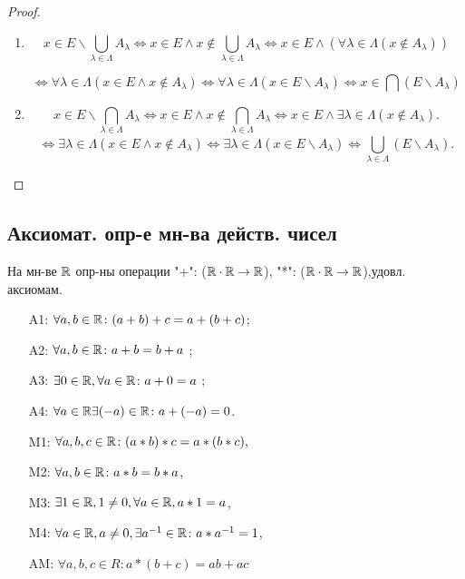 \begin{proof}
~\newline

\begin{enumerate}
    \item 
        \[
            x \in E \backslash \bigcup_{\lambda \in \Lambda} A_\lambda  \iff x \in E \land x \not\in \bigcup_{\lambda \in \Lambda} A_\lambda \iff x \in E \land (\forall \lambda \in \Lambda (x \not\in A_\lambda))
        \]

\[
    \iff \forall \lambda \in \Lambda (x \in E \land x \not\in A_\lambda) \iff \forall \lambda \in \Lambda (x \in E \backslash A_\lambda) \iff x \in \bigcap (E \backslash A_\lambda)
\]
    \item
        \[
            x \in E \backslash \bigcap_{\lambda \in \Lambda}^{}A_\lambda \iff x \in E \land x \not\in \bigcap_{\lambda\in\Lambda}^{}A_\lambda \iff x \in E \land \exists \lambda \in \Lambda (x \not\in A_\lambda)
        .\] 
        \[
        \iff \exists \lambda \in \Lambda (x \in E \land x \not\in A_\lambda) \iff \exists \lambda \in \Lambda (x \in E \backslash A_\lambda) \iff \bigcup_{\lambda \in \Lambda}^{} (E \backslash A_\lambda)
        .\] 
\end{enumerate}

\end{proof}

\subsection{Аксиомат. опр-е мн-ва действ. чисел}

На мн-ве $\mathbb{R}$ опр-ны операции "+": ($\mathbb{R} \cdot \mathbb{R} \rightarrow \mathbb{R}$), "*": ($\mathbb{R} \cdot \mathbb{R} \rightarrow \mathbb{R}$),удовл. аксиомам.

\begin{itemize}
    \item [A1: ] $\forall a, b \in \mathbb{R} \colon (a + b) + c = a + (b + c)$;
    \item [A2: ] $\forall a, b \in \mathbb{R} \colon a + b = b + a$ ;
    \item [A3: ] $\exists 0 \in \mathbb{R}, \forall a \in \mathbb{R} \colon a + 0 = a$ ;
    \item [A4: ] $\forall a \in \mathbb{R} \exists (-a) \in \mathbb{R} \colon  a + (-a) = 0$.
    \item [M1: ] $\forall a, b, c \in \mathbb{R} \colon (a * b) * c = a * (b * c),$ 
    \item [M2: ] $\forall a, b \in \mathbb{R} \colon a * b = b * a$,
    \item [M3: ] $\exists 1 \in \mathbb{R}, 1 \neq 0, \forall a \in \mathbb{R}, a * 1 = a$,
    \item [M4: ] $\forall a \in \mathbb{R}, a \neq 0, \exists a^{-1} \in \mathbb{R} \colon  a * a^{-1} = 1$,
    \item [AM: ] $\forall a, b, c \in R\colon  a * (b + c) = ab + ac$
\end{itemize}

